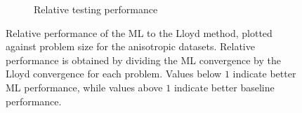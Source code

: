 \documentclass{article}
\begin{document}
\begin{figure}[h!]
\begin{subfigure}[t]{0.47\textwidth}
    \caption{Relative testing performance}
  \end{subfigure}
  \caption{Relative performance of the ML to the Lloyd method, plotted against problem size for the anisotropic datasets.  Relative performance is obtained by dividing the ML convergence by the Lloyd convergence for each problem.  Values below $1$ indicate better ML performance, while values above $1$ indicate better baseline performance.}
  \label{fig:aniso_rel_conv}
\end{figure}



\end{document}

